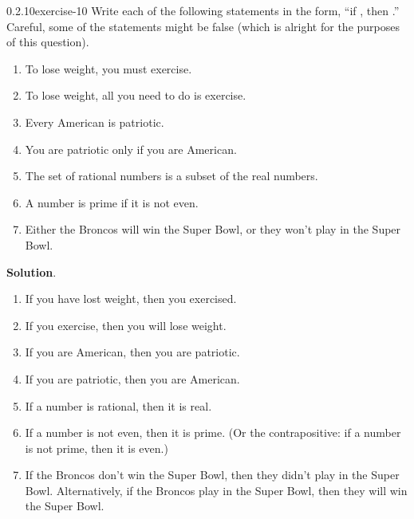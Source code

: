 \documentclass[twoside,11pt,]{book}
\numberwithin{equation}{chapter}
\begin{document}
\begin{divisionsolution}{0.2.10}{}{exercise-10}%
\hypertarget{p-260}{}%
Write each of the following statements in the form, ``if \textellipsis{}, then \textellipsis{}.'' Careful, some of the statements might be false (which is alright for the purposes of this question).\leavevmode%
\begin{enumerate}[label=(\alph*)]
\item\hypertarget{li-251}{}\hypertarget{p-261}{}%
To lose weight, you must exercise.%
\item\hypertarget{li-252}{}\hypertarget{p-262}{}%
To lose weight, all you need to do is exercise.%
\item\hypertarget{li-253}{}\hypertarget{p-263}{}%
Every American is patriotic.%
\item\hypertarget{li-254}{}\hypertarget{p-264}{}%
You are patriotic only if you are American.%
\item\hypertarget{li-255}{}\hypertarget{p-265}{}%
The set of rational numbers is a subset of the real numbers.%
\item\hypertarget{li-256}{}\hypertarget{p-266}{}%
A number is prime if it is not even.%
\item\hypertarget{li-257}{}\hypertarget{p-267}{}%
Either the Broncos will win the Super Bowl, or they won't play in the Super Bowl.%
\end{enumerate}
%
\par\smallskip%
\noindent\textbf{Solution}.\quad%
\hypertarget{p-268}{}%
\leavevmode%
\begin{enumerate}[label=(\alph*)]
\item\hypertarget{li-258}{}\hypertarget{p-269}{}%
If you have lost weight, then you exercised.%
\item\hypertarget{li-259}{}\hypertarget{p-270}{}%
If you exercise, then you will lose weight.%
\item\hypertarget{li-260}{}\hypertarget{p-271}{}%
If you are American, then you are patriotic.%
\item\hypertarget{li-261}{}\hypertarget{p-272}{}%
If you are patriotic, then you are American.%
\item\hypertarget{li-262}{}\hypertarget{p-273}{}%
If a number is rational, then it is real.%
\item\hypertarget{li-263}{}\hypertarget{p-274}{}%
If a number is not even, then it is prime. (Or the contrapositive: if a number is not prime, then it is even.)%
\item\hypertarget{li-264}{}\hypertarget{p-275}{}%
If the Broncos don't win the Super Bowl, then they didn't play in the Super Bowl. Alternatively, if the Broncos play in the Super Bowl, then they will win the Super Bowl.%
\end{enumerate}
%
\end{divisionsolution}%
\end{document}
